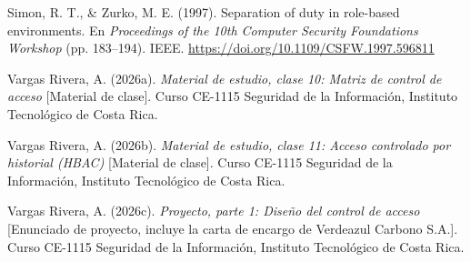 \documentclass[11pt,letterpaper]{article}
\begin{document}
{Simon, R. T., \& Zurko, M. E. (1997). Separation of duty in role-based environments. En
\emph{Proceedings of the 10th Computer Security Foundations Workshop} (pp. 183--194). IEEE.
\url{https://doi.org/10.1109/CSFW.1997.596811}

Vargas Rivera, A. (2026a). \emph{Material de estudio, clase 10: Matriz de control de acceso}
[Material de clase]. Curso CE-1115 Seguridad de la Información, Instituto Tecnológico de Costa Rica.

Vargas Rivera, A. (2026b). \emph{Material de estudio, clase 11: Acceso controlado por historial (HBAC)}
[Material de clase]. Curso CE-1115 Seguridad de la Información, Instituto Tecnológico de Costa Rica.

Vargas Rivera, A. (2026c). \emph{Proyecto, parte 1: Diseño del control de acceso} [Enunciado de
proyecto, incluye la carta de encargo de Verdeazul Carbono S.A.]. Curso CE-1115 Seguridad de la
Información, Instituto Tecnológico de Costa Rica.

}
\end{document}
